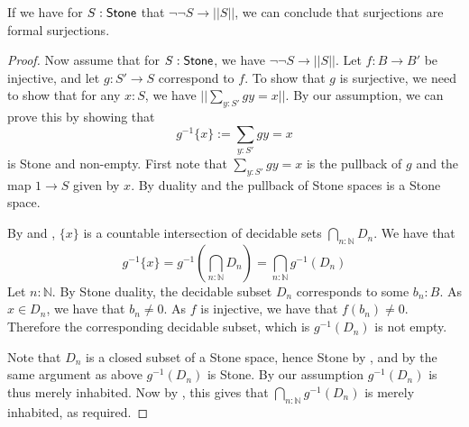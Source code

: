 \begin{corollary}\label{CorDoubleNegToAx2}
  If we have for $S:\mathsf{Stone}$ that $\neg \neg S \to ||S||$, 
  we can conclude that surjections are formal surjections. 
\end{corollary}
\begin{proof}
  Now assume that for $S:\mathsf{Stone}$, we have $\neg \neg S \to ||S||$. 
  Let $f:B \to B'$ be injective, and let 
  $g:S' \to S$ correspond to $f$. 
  To show that $g$ is surjective, we need to show that for any $x:S$, we have $||\sum\limits_{y:S'} g y = x||$. 
  By our assumption, we can prove this by showing that 
  \begin{equation}
    g^{-1}\{x\} := \sum\limits_{y:S'} g y = x
  \end{equation} is Stone and non-empty. 
    First note that $\sum\limits_{y:S'} g y = x$ is the pullback of $g$ and the map $1 \to S$ given by $x$.
      By duality and  the pullback of Stone spaces is a Stone space. 
   

      By  and , 
      $\{x\}$ is a countable intersection of decidable sets $\bigcap_{n:\mathbb N} D_n$. 
      We have that 
      \begin{equation}
        g^{-1}\{x\} = g^{-1}(\bigcap_{n:\mathbb N} D_n) = 
        \bigcap_{n:\mathbb N} g^{-1}(D_n)
      \end{equation} 
      Let $n:\mathbb N$. By Stone duality, the decidable subset $D_n$ corresponds to some $b_n:B$. 
      As $x\in D_n$, we have that $b_n \neq 0$. 
      As $f$ is injective, we have that $f(b_n) \neq 0$. 
      Therefore the corresponding decidable subset, which is $g^{-1}(D_n)$ is not empty. 

      Note that $D_n$ is a closed subset of a Stone space, hence Stone by , 
      and by the same argument as above $g^{-1}(D_n)$ is Stone. By our assumption $g^{-1}(D_n)$ is thus merely inhabited. 
      Now by , this gives that 
      $\bigcap_{n:\mathbb N} g^{-1}(D_n)$ is merely inhabited, as required. 
\end{proof}

